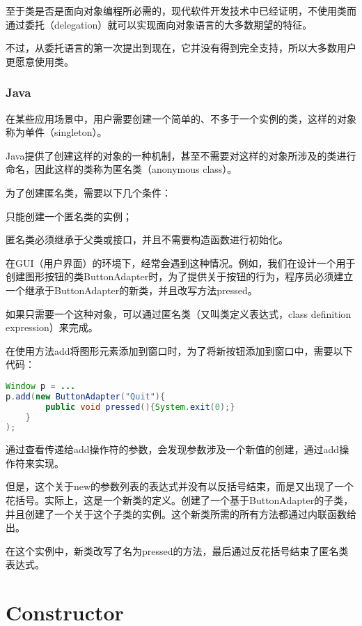 至于类是否是面向对象编程所必需的，现代软件开发技术中已经证明，不使用类而通过委托（delegation）就可以实现面向对象语言的大多数期望的特征。

不过，从委托语言的第一次提出到现在，它并没有得到完全支持，所以大多数用户更愿意使用类。


\subsection{Java}

在某些应用场景中，用户需要创建一个简单的、不多于一个实例的类，这样的对象称为单件（singleton）。


Java提供了创建这样的对象的一种机制，甚至不需要对这样的对象所涉及的类进行命名，因此这样的类称为匿名类（anonymous class）。

为了创建匿名类，需要以下几个条件：

\begin{compactenum}
\item 只能创建一个匿名类的实例；
\item 匿名类必须继承于父类或接口，并且不需要构造函数进行初始化。
\end{compactenum}

在GUI（用户界面）的环境下，经常会遇到这种情况。例如，我们在设计一个用于创建图形按钮的类ButtonAdapter时，为了提供关于按钮的行为，程序员必须建立一个继承于ButtonAdapter的新类，并且改写方法pressed。

如果只需要一个这种对象，可以通过匿名类（又叫类定义表达式，class definition expression）来完成。

在使用方法add将图形元素添加到窗口时，为了将新按钮添加到窗口中，需要以下代码：


\begin{lstlisting}[language=Java]
Window p = ...
p.add(new ButtonAdapter("Quit"){
		public void pressed(){System.exit(0);}
	}
);
\end{lstlisting}

通过查看传递给add操作符的参数，会发现参数涉及一个新值的创建，通过add操作符来实现。

但是，这个关于new的参数列表的表达式并没有以反括号结束，而是又出现了一个花括号。实际上，这是一个新类的定义。创建了一个基于ButtonAdapter的子类，并且创建了一个关于这个子类的实例。这个新类所需的所有方法都通过内联函数给出。

在这个实例中，新类改写了名为pressed的方法，最后通过反花括号结束了匿名类表达式。


\chapter{Constructor}

